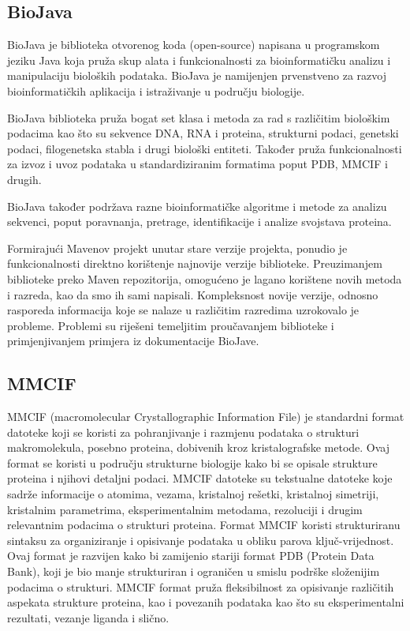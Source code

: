 \documentclass[times, utf8, zavrsni]{fer}
\begin{document}
\subsection{BioJava}
BioJava je biblioteka otvorenog koda (open-source) napisana u programskom jeziku Java koja pruža skup alata i funkcionalnosti za bioinformatičku analizu i manipulaciju bioloških podataka. BioJava je namijenjen prvenstveno za razvoj bioinformatičkih aplikacija i istraživanje u području biologije.

BioJava biblioteka pruža bogat set klasa i metoda za rad s različitim biološkim podacima kao što su sekvence DNA, RNA i proteina, strukturni podaci, genetski podaci, filogenetska stabla i drugi biološki entiteti. Također pruža funkcionalnosti za izvoz i uvoz podataka u standardiziranim formatima poput PDB, MMCIF i drugih. \cite{biojava}

BioJava također podržava razne bioinformatičke algoritme i metode za analizu sekvenci, poput poravnanja, pretrage, identifikacije i analize svojstava proteina. 

Formirajući Mavenov projekt unutar stare verzije projekta, ponudio je funkcionalnosti direktno korištenje najnovije verzije biblioteke.
Preuzimanjem biblioteke preko Maven repozitorija, omogućeno je lagano korištene novih metoda i razreda, kao da smo ih sami napisali.
Kompleksnost novije verzije, odnosno rasporeda informacija koje se nalaze u različitim razredima  uzrokovalo je probleme. 
Problemi su riješeni temeljitim proučavanjem biblioteke i primjenjivanjem primjera iz dokumentacije BioJave.
\subsection{MMCIF}
MMCIF (macromolecular Crystallographic Information File) je standardni format datoteke koji se koristi za pohranjivanje i razmjenu podataka o strukturi makromolekula, posebno proteina, dobivenih kroz kristalografske metode. Ovaj format se koristi u području strukturne biologije kako bi se opisale strukture proteina i njihovi detaljni podaci.
MMCIF datoteke su tekstualne datoteke koje sadrže informacije o atomima, vezama, kristalnoj rešetki, kristalnoj simetriji, kristalnim parametrima, eksperimentalnim metodama, rezoluciji i drugim relevantnim podacima o strukturi proteina. Format MMCIF koristi strukturiranu sintaksu za organiziranje i opisivanje podataka u obliku parova ključ-vrijednost.
Ovaj format je razvijen kako bi zamijenio stariji format PDB (Protein Data Bank), koji je bio manje strukturiran i ograničen u smislu podrške složenijim podacima o strukturi. MMCIF format pruža fleksibilnost za opisivanje različitih aspekata strukture proteina, kao i povezanih podataka kao što su eksperimentalni rezultati, vezanje liganda i slično.
\end{document}
